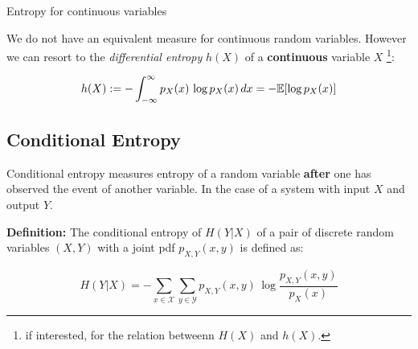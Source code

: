 \begin{frame}{Entropy for continuous variables}

We do not have an equivalent measure for continuous random variables. 
However we can resort to the \emph{differential entropy} $h(X)$ of a \textbf{continuous} variable $X$
\footnote{if interested, \citealp[see][Ch~10.2]{haykin1994neural} for the relation betweenn $H(X)$ and $h(X)$.}:

\begin{equation}
\label{eq:entropydiff}
h(X) := - \int_{-\infty}^{\infty} p_X(x)\,\log p_X(x) \, dx 
= - \mathbb{E} \lbrack \log p_X(x) \rbrack
\end{equation}

\end{frame}




\subsection{Conditional Entropy}

\begin{frame}{\subsecname}

Conditional entropy measures entropy of a random variable \textbf{after} one has observed the event of another variable.
In the case of a system with input $X$ and output $Y$.

\end{frame}

\begin{frame}{\subsecname}

\textbf{Definition:} 
The conditional entropy of $H(Y|X)$ of a pair of discrete random variables $(X,Y)$ with a joint pdf $p_{X,Y}(x,y)$ is defined as:

\begin{equation}
\label{eq:entropycond}
H(Y|X) = -\sum_{x \in \mathcal{X}} \sum_{y \in \mathcal{Y}} p_{X,Y}(x,y)\,\log \frac{p_{X,Y}(x,y)}{p_X(x)}
\end{equation}


\end{frame}

